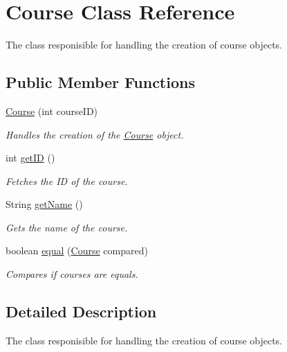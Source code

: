 \hypertarget{classCourse}{}\section{Course Class Reference}
\label{classCourse}


The class responisible for handling the creation of course objects.  


\subsection*{Public Member Functions}
\begin{DoxyCompactItemize}
\item 
\hypertarget{classCourse_ad46914a287c32f1d646b5a3950bcf650}{}\hyperlink{classCourse_ad46914a287c32f1d646b5a3950bcf650}{Course} (int course\+I\+D)\label{classCourse_ad46914a287c32f1d646b5a3950bcf650}

\begin{DoxyCompactList}\small\item\em Handles the creation of the \hyperlink{classCourse}{Course} object. \end{DoxyCompactList}\item 
int \hyperlink{classCourse_a7c3868d4b05bfb7671f4f54d1b04d757}{get\+I\+D} ()
\begin{DoxyCompactList}\small\item\em Fetches the I\+D of the course. \end{DoxyCompactList}\item 
String \hyperlink{classCourse_a246738ee9b960276574bca77b96f896c}{get\+Name} ()
\begin{DoxyCompactList}\small\item\em Gets the name of the course. \end{DoxyCompactList}\item 
boolean \hyperlink{classCourse_a7a284838ae67aafe23ffb0466559af7b}{equal} (\hyperlink{classCourse}{Course} compared)
\begin{DoxyCompactList}\small\item\em Compares if courses are equals. \end{DoxyCompactList}\end{DoxyCompactItemize}


\subsection{Detailed Description}
The class responisible for handling the creation of course objects. 

